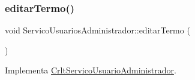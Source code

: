 \mbox{\label{class_servico_usuarios_administrador_a219b135060f3a85d996f506474b99f48}} 
\subsubsection{\texorpdfstring{editar\+Termo()}{editarTermo()}}
{\footnotesize\ttfamily void Servico\+Usuarios\+Administrador\+::editar\+Termo (\begin{DoxyParamCaption}{ }\end{DoxyParamCaption})\hspace{0.3cm}{\ttfamily [virtual]}}



Implementa \mbox{\hyperlink{class_crlt_servico_usuario_administrador_a18da82fdae717b90254dbaa003ac14cb}{Crlt\+Servico\+Usuario\+Administrador}}.


